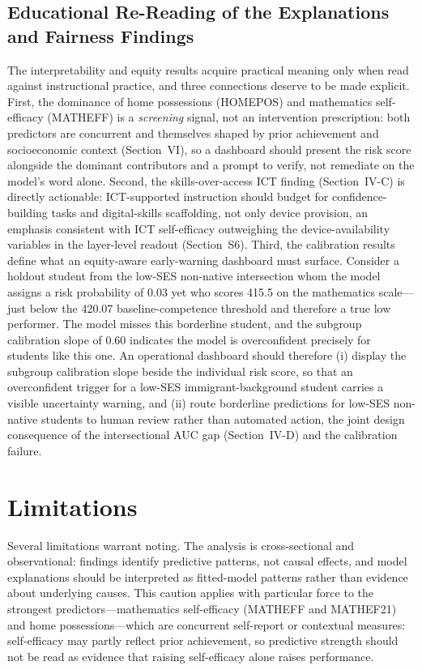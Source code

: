 \documentclass[journal]{IEEEtran}
\begin{document}
\subsection{Educational Re-Reading of the Explanations and Fairness Findings}
The interpretability and equity results acquire practical meaning only when read against instructional practice, and three connections deserve to be made explicit. First, the dominance of home possessions (HOMEPOS) and mathematics self-efficacy (MATHEFF) is a \emph{screening} signal, not an intervention prescription: both predictors are concurrent and themselves shaped by prior achievement and socioeconomic context (Section~VI), so a dashboard should present the risk score alongside the dominant contributors and a prompt to verify, not remediate on the model's word alone. Second, the skills-over-access ICT finding (Section~IV-C) is directly actionable: ICT-supported instruction should budget for confidence-building tasks and digital-skills scaffolding, not only device provision, an emphasis consistent with ICT self-efficacy outweighing the device-availability variables in the layer-level readout (Section~S6). Third, the calibration results define what an equity-aware early-warning dashboard must surface. Consider a holdout student from the low-SES non-native intersection whom the model assigns a risk probability of 0.03 yet who scores 415.5 on the mathematics scale---just below the 420.07 baseline-competence threshold and therefore a true low performer. The model misses this borderline student, and the subgroup calibration slope of 0.60 indicates the model is overconfident precisely for students like this one. An operational dashboard should therefore (i) display the subgroup calibration slope beside the individual risk score, so that an overconfident trigger for a low-SES immigrant-background student carries a visible uncertainty warning, and (ii) route borderline predictions for low-SES non-native students to human review rather than automated action, the joint design consequence of the intersectional AUC gap (Section~IV-D) and the calibration failure.

\section{Limitations}
Several limitations warrant noting. The analysis is cross-sectional and observational: findings identify predictive patterns, not causal effects, and model explanations should be interpreted as fitted-model patterns rather than evidence about underlying causes. This caution applies with particular force to the strongest predictors---mathematics self-efficacy (MATHEFF and MATHEF21) and home possessions---which are concurrent self-report or contextual measures: self-efficacy may partly reflect prior achievement, so predictive strength should not be read as evidence that raising self-efficacy alone raises performance.
\end{document}
